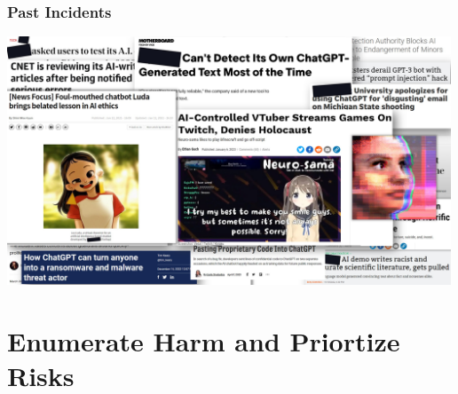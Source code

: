 \documentclass[11pt,
               aspectratio=169,
               hyperref={colorlinks}
               ]{beamer}
\begin{document}
		\begin{frame}
			
			\frametitle{Past Incidents}
			\centering
			\includegraphics[height=210pt]{../img/pastincidents.jpg}
								
		\end{frame}


	\section{Enumerate Harm and Priortize Risks}
\end{document}
